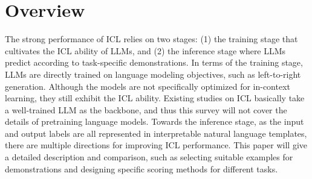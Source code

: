 \section{Overview}
The strong performance of ICL relies on two stages: (1) the training stage that cultivates the ICL ability of LLMs, and (2) the inference stage where LLMs predict according to task-specific demonstrations.
In terms of the training stage, LLMs are directly trained on language modeling objectives, such as left-to-right generation. Although the models are not specifically optimized for in-context learning, they still exhibit the ICL ability.
Existing studies on ICL basically take a well-trained LLM as the backbone, and thus this survey will not cover the details of pretraining language models. 
Towards the inference stage, as the input and output labels are all represented in interpretable natural language templates, there are multiple directions for improving ICL performance. This paper will give a detailed description and comparison, such as selecting suitable examples for demonstrations and designing specific scoring methods for different tasks.
